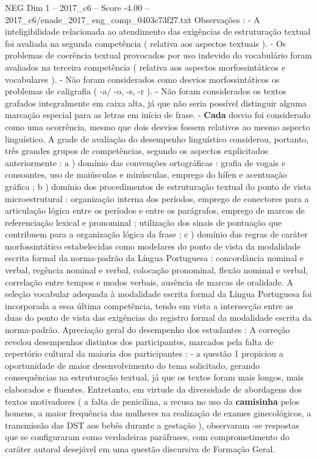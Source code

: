\begin{textsample}{NEG Dim 1 – 2017\_c6 – Score -4.00 – 2017\_c6/enade\_2017\_eng\_comp\_0403c73f27.txt}
Observações : - A inteligibilidade relacionada ao atendimento das exigências de estruturação textual foi avaliada na segunda competência ( relativa aos aspectos textuais ). - Os problemas de coerência textual provocados por uso indevido do vocabulário foram avaliados na terceira competência ( relativa aos aspectos morfossintáticos e vocabulares ). - Não foram considerados como desvios morfossintáticos os problemas de caligrafia ( -a/ -o, -s, -r ). - Não foram considerados os textos grafados integralmente em caixa alta, já que não seria possível distinguir alguma marcação especial para as letras em início de frase. - \textbf{Cada} desvio foi considerado como uma ocorrência, mesmo que dois desvios fossem relativos ao mesmo aspecto linguístico.
A grade de avaliação do desempenho linguístico considerou, portanto, três grandes grupos de competências, segundo os aspectos explicitados anteriormente : a ) domínio das convenções ortográficas : grafia de vogais e consoantes, uso de maiúsculas e minúsculas, emprego do hífen e acentuação gráfica ; b ) domínio dos procedimentos de estruturação textual do ponto de vista microestrutural : organização interna dos períodos, emprego de conectores para a articulação lógica entre os períodos e entre os parágrafos, emprego de marcas de referenciação lexical e pronominal ; utilização dos sinais de pontuação que contribuem para a organização lógica da frase ; c ) domínio das regras de caráter morfossintático estabelecidas como modelares do ponto de vista da modalidade escrita formal da norma-padrão da Língua Portuguesa : concordância nominal e verbal, regência nominal e verbal, colocação pronominal, flexão nominal e verbal, correlação entre tempos e modos verbais, ausência de marcas de oralidade.
A seleção vocabular adequada à modalidade escrita formal da Língua Portuguesa foi incorporada a essa última competência, tendo em vista a intersecção entre as duas do ponto de vista das exigências do registro formal da modalidade escrita da norma-padrão.
Apreciação geral do desempenho dos estudantes : A correção revelou desempenhos distintos dos participantes, marcados pela falta de repertório cultural da maioria dos participantes : - a questão 1 propiciou a oportunidade de maior desenvolvimento do tema solicitado, gerando consequências na estruturação textual, já que os textos foram mais longos, mais elaborados e fluentes.
Entretanto, em virtude da diversidade de abordagens dos textos motivadores ( a falta de penicilina, a recusa no uso da \textbf{camisinha} pelos homens, a maior frequência das mulheres na realização de exames ginecológicos, a transmissão das DST aos bebês durante a gestação ), observaram -se respostas que se configuraram como verdadeiras paráfrases, com comprometimento do caráter autoral desejável em uma questão discursiva de Formação Geral.

\end{textsample}
